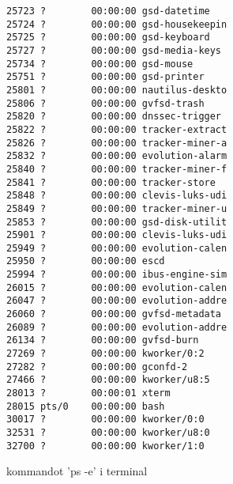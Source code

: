 \documentclass[a4paper]{article}
\begin{document}
\begin{figure}
\begin{verbatim}
25723 ?        00:00:00 gsd-datetime
25724 ?        00:00:00 gsd-housekeepin
25725 ?        00:00:00 gsd-keyboard
25727 ?        00:00:00 gsd-media-keys
25734 ?        00:00:00 gsd-mouse
25751 ?        00:00:00 gsd-printer
25801 ?        00:00:00 nautilus-deskto
25806 ?        00:00:00 gvfsd-trash
25820 ?        00:00:00 dnssec-trigger
25822 ?        00:00:00 tracker-extract
25826 ?        00:00:00 tracker-miner-a
25832 ?        00:00:00 evolution-alarm
25840 ?        00:00:00 tracker-miner-f
25841 ?        00:00:00 tracker-store
25848 ?        00:00:00 clevis-luks-udi
25849 ?        00:00:00 tracker-miner-u
25853 ?        00:00:00 gsd-disk-utilit
25901 ?        00:00:00 clevis-luks-udi
25949 ?        00:00:00 evolution-calen
25950 ?        00:00:00 escd
25994 ?        00:00:00 ibus-engine-sim
26015 ?        00:00:00 evolution-calen
26047 ?        00:00:00 evolution-addre
26060 ?        00:00:00 gvfsd-metadata
26089 ?        00:00:00 evolution-addre
26134 ?        00:00:00 gvfsd-burn
27269 ?        00:00:00 kworker/0:2
27282 ?        00:00:00 gconfd-2
27466 ?        00:00:00 kworker/u8:5
28013 ?        00:00:01 xterm
28015 pts/0    00:00:00 bash
30017 ?        00:00:00 kworker/0:0
32531 ?        00:00:00 kworker/u8:0
32700 ?        00:00:00 kworker/1:0
\end{verbatim}
\caption{kommandot 'ps -e' i terminal}
\end{figure}
\end{document}
